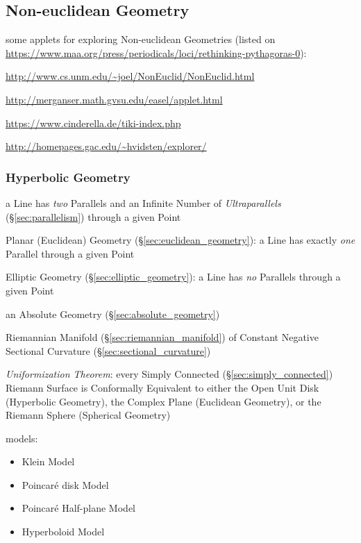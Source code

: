 \subsection{Non-euclidean Geometry}\label{sec:noneuclidean_geometry}

some applets for exploring Non-euclidean Geometries (listed on
\url{https://www.maa.org/press/periodicals/loci/rethinking-pythagoras-0}):

\url{http://www.cs.unm.edu/~joel/NonEuclid/NonEuclid.html}

\url{http://merganser.math.gvsu.edu/easel/applet.html}

\url{https://www.cinderella.de/tiki-index.php}

\url{http://homepages.gac.edu/~hvidsten/explorer/}



\subsubsection{Hyperbolic Geometry}\label{sec:hyperbolic_geometry}

a Line has \emph{two} Parallels and an Infinite Number of \emph{Ultraparallels}
(\S\ref{sec:parallelism}) through a given Point

\fist Planar (Euclidean) Geometry (\S\ref{sec:euclidean_geometry}): a Line has
  exactly \emph{one} Parallel through a given Point

\fist Elliptic Geometry (\S\ref{sec:elliptic_geometry}): a Line has \emph{no}
  Parallels through a given Point

an Absolute Geometry (\S\ref{sec:absolute_geometry})


Riemannian Manifold (\S\ref{sec:riemannian_manifold}) of Constant Negative
Sectional Curvature (\S\ref{sec:sectional_curvature})

\emph{Uniformization Theorem}: every Simply Connected
(\S\ref{sec:simply_connected}) Riemann Surface is Conformally Equivalent to
either the Open Unit Disk (Hyperbolic Geometry), the Complex Plane (Euclidean
Geometry), or the Riemann Sphere (Spherical Geometry)

models:
\begin{itemize}
  \item Klein Model
  \item Poincar\'e disk Model
  \item Poincar\'e Half-plane Model
  \item Hyperboloid Model
\end{itemize}




